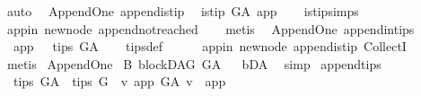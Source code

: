 \begin{isabellebody}
\ auto%
\endisatagproof
{\isafoldproof}%
%
\isadelimproof
\isanewline
%
\endisadelimproof
\isanewline
{}\isamarkupfalse%
\ {\isacharparenleft}{\kern0pt}\ Append{\isacharunderscore}{\kern0pt}One{\isacharparenright}{\kern0pt}\ append{\isacharunderscore}{\kern0pt}is{\isacharunderscore}{\kern0pt}tip{\isacharcolon}{\kern0pt}\isanewline
\ \ {\isachardoublequoteopen}is{\isacharunderscore}{\kern0pt}tip\ G{\isacharunderscore}{\kern0pt}A\ app{\isachardoublequoteclose}\isanewline
%
\isadelimproof
\ \ %
\endisadelimproof
%
\isatagproof
{}\isamarkupfalse%
\ is{\isacharunderscore}{\kern0pt}tip{\isachardot}{\kern0pt}simps\ \isanewline
\ \ \isamarkupfalse%
\ app{\isacharunderscore}{\kern0pt}in\ new{\isacharunderscore}{\kern0pt}node\ append{\isacharunderscore}{\kern0pt}not{\isacharunderscore}{\kern0pt}reached\isanewline
\ \ \isamarkupfalse%
\ metis%
\endisatagproof
{\isafoldproof}%
%
\isadelimproof
\isanewline
%
\endisadelimproof
\isanewline
{}\isamarkupfalse%
\ {\isacharparenleft}{\kern0pt}\ Append{\isacharunderscore}{\kern0pt}One{\isacharparenright}{\kern0pt}\ append{\isacharunderscore}{\kern0pt}in{\isacharunderscore}{\kern0pt}tips{\isacharcolon}{\kern0pt}\isanewline
\ \ {\isachardoublequoteopen}app\ \ {\isasymin}\ tips\ G{\isacharunderscore}{\kern0pt}A{\isachardoublequoteclose}\isanewline
%
\isadelimproof
\ \ %
\endisadelimproof
%
\isatagproof
{}\isamarkupfalse%
\ tips{\isacharunderscore}{\kern0pt}def\ \ \isanewline
\ \ \isamarkupfalse%
\ app{\isacharunderscore}{\kern0pt}in\ new{\isacharunderscore}{\kern0pt}node\ append{\isacharunderscore}{\kern0pt}is{\isacharunderscore}{\kern0pt}tip\ CollectI\isanewline
\ \ \isamarkupfalse%
\ metis%
\endisatagproof
{\isafoldproof}%
%
\isadelimproof
\isanewline
%
\endisadelimproof
\isanewline
\isanewline
{}\isamarkupfalse%
\ Append{\isacharunderscore}{\kern0pt}One\isanewline
{}\isanewline
{}\isamarkupfalse%
\ B{}{\isacharcolon}{\kern0pt}\ blockDAG\ G{\isacharunderscore}{\kern0pt}A%
\isadelimproof
\ %
\endisadelimproof
%
\isatagproof
{}\isamarkupfalse%
\ bD{\isacharunderscore}{\kern0pt}A\ \isamarkupfalse%
\ simp%
\endisatagproof
{\isafoldproof}%
%
\isadelimproof
%
\endisadelimproof
\isanewline
{}\isamarkupfalse%
\ append{\isacharunderscore}{\kern0pt}tips{\isacharcolon}{\kern0pt}\isanewline
\ \ {\isachardoublequoteopen}tips\ G{\isacharunderscore}{\kern0pt}A\ {\isacharequal}{\kern0pt}\ tips\ G\ {\isacharminus}{\kern0pt}\ {\isacharbraceleft}{\kern0pt}v{\isachardot}{\kern0pt}\ {\isacharparenleft}{\kern0pt}app\ {\isasymrightarrow}\isactrlsup {\isacharplus}{\kern0pt}\isactrlbsub G{\isacharunderscore}{\kern0pt}A\isactrlesub \ v{\isacharparenright}{\kern0pt}{\isacharbraceright}{\kern0pt}\ {\isasymunion}\ {\isacharbraceleft}{\kern0pt}app{\isacharbraceright}{\kern0pt}{\isachardoublequoteclose}\isanewline

\end{isabellebody}
